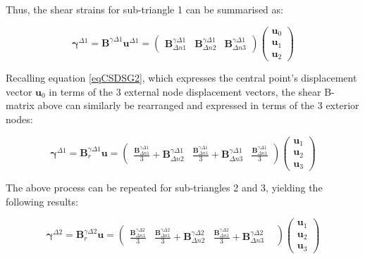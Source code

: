 Thus, the shear strains for sub-triangle 1 can be summarised as:

  \begin{equation} 
\boldsymbol{\gamma}^{\Delta 1} =
\mathbf{B}^{\gamma\Delta 1}
\mathbf{u}^{\Delta 1}
=
\begin{pmatrix}
\mathbf{B}_{\Delta n1}^{\gamma\Delta 1} & \mathbf{B}_{\Delta n2}^{\gamma\Delta 1} & \mathbf{B}_{\Delta n3}^{\gamma\Delta 1}
\end{pmatrix}
\begin{pmatrix}
\mathbf{u}_0 \\
\mathbf{u}_1 \\
\mathbf{u}_2
\end{pmatrix}
\label{eqCSDSG7}
\end{equation}

Recalling equation \ref{eqCSDSG2}, which expresses the central point's displacement vector $\mathbf{u}_0$ in terms of the 3 external node displacement vectors, the shear B-matrix above can similarly be rearranged and expressed in terms of the 3 exterior nodes:

  \begin{equation} 
\boldsymbol{\gamma}^{\Delta 1} =
\mathbf{B}_r^{\gamma\Delta 1}
\mathbf{u}
=
\begin{pmatrix}
\frac{\mathbf{B}_{\Delta n1}^{\gamma\Delta 1}}{3} + \mathbf{B}_{\Delta n2}^{\gamma\Delta 1} & \frac{\mathbf{B}_{\Delta n1}^{\gamma\Delta 1}}{3} + \mathbf{B}_{\Delta n3}^{\gamma\Delta 1} & \frac{\mathbf{B}_{\Delta n1}^{\gamma\Delta 1}}{3}
\end{pmatrix}
\begin{pmatrix}
\mathbf{u}_1 \\
\mathbf{u}_2 \\
\mathbf{u}_3
\end{pmatrix}
\label{eqCSDSG8}
\end{equation}

The above process can be repeated for sub-triangles 2 and 3, yielding the following results:

  \begin{equation} 
\boldsymbol{\gamma}^{\Delta 2} =
\mathbf{B}_r^{\gamma\Delta 2}
\mathbf{u}
=
\begin{pmatrix}
\frac{\mathbf{B}_{\Delta n1}^{\gamma\Delta 2}}{3} &
\frac{\mathbf{B}_{\Delta n1}^{\gamma\Delta 2}}{3} + \mathbf{B}_{\Delta n2}^{\gamma\Delta 2} &
\frac{\mathbf{B}_{\Delta n1}^{\gamma\Delta 2}}{3} + \mathbf{B}_{\Delta n3}^{\gamma\Delta 2} &  
\end{pmatrix}
\begin{pmatrix}
\mathbf{u}_1 \\
\mathbf{u}_2 \\
\mathbf{u}_3
\end{pmatrix}
\label{eqCSDSG9}
\end{equation}

